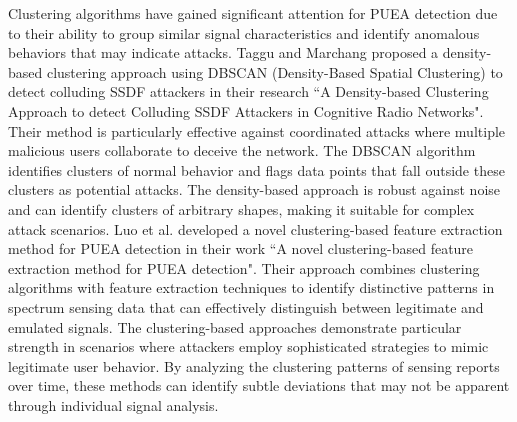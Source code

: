 Clustering algorithms have gained significant attention for PUEA detection due to their ability to group similar signal characteristics and identify anomalous behaviors that may indicate attacks.
Taggu and Marchang \cite{ref21} proposed a density-based clustering approach using DBSCAN (Density-Based Spatial Clustering) to detect colluding SSDF attackers in their research ``A Density-based Clustering Approach to detect Colluding SSDF Attackers in Cognitive Radio Networks". Their method is particularly effective against coordinated attacks where multiple malicious users collaborate to deceive the network. The DBSCAN algorithm identifies clusters of normal behavior and flags data points that fall outside these clusters as potential attacks. The density-based approach is robust against noise and can identify clusters of arbitrary shapes, making it suitable for complex attack scenarios.
Luo et al. \cite{ref13} developed a novel clustering-based feature extraction method for PUEA detection in their work ``A novel clustering-based feature extraction method for PUEA detection". Their approach combines clustering algorithms with feature extraction techniques to identify distinctive patterns in spectrum sensing data that can effectively distinguish between legitimate and emulated signals.
The clustering-based approaches demonstrate particular strength in scenarios where attackers employ sophisticated strategies to mimic legitimate user behavior. By analyzing the clustering patterns of sensing reports over time, these methods can identify subtle deviations that may not be apparent through individual signal analysis.



